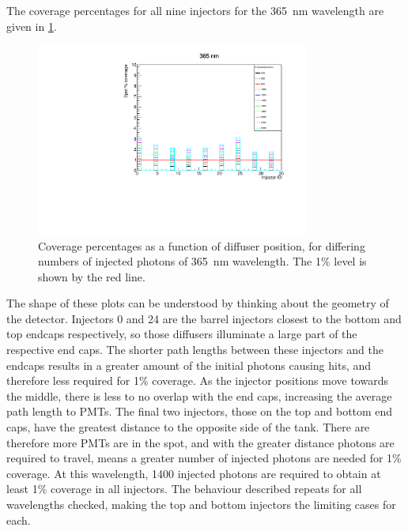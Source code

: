 \documentclass[a4paper,11pt]{article}
\begin{document}
The coverage percentages for all nine injectors for the 365~nm wavelength are given in \cref{fig:coverage_365}.
\begin{figure}
\centering
\includegraphics[width=0.8\textwidth]{coverage_365.pdf}
\caption{Coverage percentages as a function of diffuser position, for differing numbers of injected photons of 365~nm wavelength. The 1\% level is shown by the red line.}\label{fig:coverage_365}
\end{figure}
The shape of these plots can be understood by thinking about the geometry of the detector. Injectors 0 and 24 are the barrel injectors closest to the bottom and top endcaps respectively, so those diffusers illuminate a large part of the respective end caps. The shorter path lengths between these injectors and the endcaps results in a greater amount of the initial photons causing hits, and therefore less required for 1\% coverage. As the injector positions move towards the middle, there is less to no overlap with the end caps, increasing the average path length to PMTs. The final two injectors, those on the top and bottom end caps, have the greatest distance to the opposite side of the tank. There are therefore more PMTs are in the spot, and with the greater distance photons are required to travel, means a greater number of injected photons are needed for 1\% coverage. At this wavelength, 1400 injected photons are required to obtain at least 1\% coverage in all injectors. The behaviour described repeats for all wavelengths checked, making the top and bottom injectors the limiting cases for each.
\end{document}

